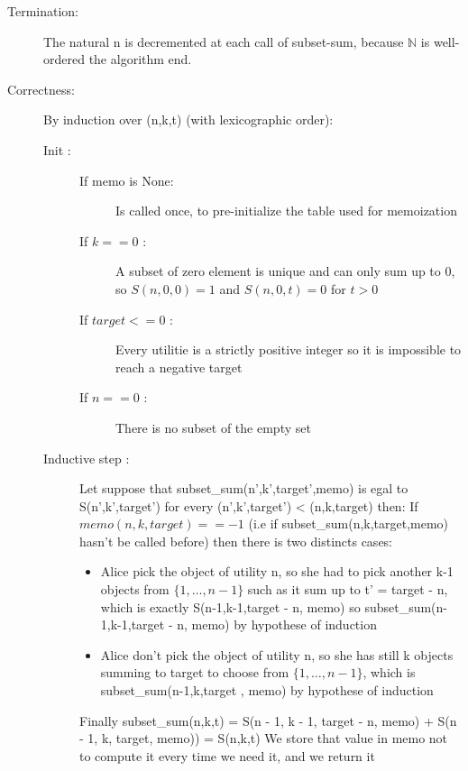 \documentclass[a4paper, english, 10pt]{article}
\begin{document}
\begin{description}
	\item[Termination:] The natural n is decremented at each call of subset-sum, because $\mathbb{N}$ is well-ordered the algorithm end.
	\item[Correctness:] By induction over (n,k,t) (with lexicographic order):
	
	
		\begin{description}
			\item[Init :]
			\begin{description}
			\item[If memo is None:] Is called once, to pre-initialize the table used for memoization
			\item[If $k==0$ :] A subset of zero element is unique and can only sum up to 0, so $S(n,0,0) = 1$ and $S(n,0,t) = 0$ for $t > 0$ 
			\item[If $target <= 0$ :] Every utilitie is a strictly positive integer so it is impossible to reach a negative target
			\item[If $n==0$ :] There is no subset of the empty set
			\end{description}
			\item[Inductive step :] Let suppose that subset\_sum(n',k',target',memo) is egal to S(n',k',target') for every (n',k',target') < (n,k,target) then:
			 If $ memo(n,k,target) == -1 $ (i.e if subset\_sum(n,k,target,memo) hasn't be called before) then there is two distincts cases:
			  \begin{itemize}
			  	\item Alice pick the object of utility n, so she had to pick another k-1 objects from $\{1, \dots, n-1\}$ such as it sum up to t' = target - n, which is exactly S(n-1,k-1,target - n, memo) so subset\_sum(n-1,k-1,target - n, memo) by hypothese of induction
			  	\item Alice don't pick the object of utility n, so she has still k objects summing to target to choose from $\{1, \dots, n-1\}$, which is subset\_sum(n-1,k,target , memo) by hypothese of induction
			  \end{itemize}
		  Finally subset\_sum(n,k,t) = S(n - 1, k - 1, target - n, memo) + S(n - 1, k, target, memo)) = S(n,k,t)
		  We store that value in memo not to compute it every time we need it, and we return it
		  

			
			
			 
		\end{description}
\end{description} 
\end{document}
